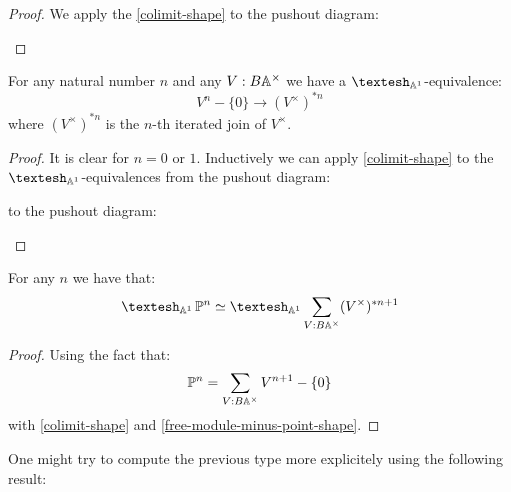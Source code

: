 \begin{proof}
We apply the \cref{colimit-shape} to the pushout diagram:
 \begin{center}
  \end{center}
  \end{proof}

\begin{lemma}\label{free-module-minus-point-shape}
For any natural number $n$ and any $V:B\mathbb{A}^\times$ we have a $\shape_{\A^1}$-equivalence:
\[V^{n}-\{0\} \to (V^\times)^{*n}\]
where $(V^\times)^{*n}$ is the $n$-th iterated join of $V^\times$.
\end{lemma}

\begin{proof}
It is clear for $n=0$ or $1$. Inductively we can apply \cref{colimit-shape} to the $\shape_{\A^1}$-equivalences from the pushout diagram:
 \begin{center}
  \end{center}
  to the pushout diagram:
   \begin{center}
  \end{center}
\end{proof}

\begin{proposition}
For any $n$ we have that:
\[\shape_{\A^1} \bP^n \simeq \shape_{\A^1} \sum_{V:B\A^\times} (V^\times)^{*n+1}\]
\end{proposition}

\begin{proof}
Using the fact that:
\[\mathbb{P}^n = \sum_{V:B\mathbb{A}^\times} V^{n+1}-\{0\}\]
with \cref{colimit-shape} and \cref{free-module-minus-point-shape}.
\end{proof}

One might try to compute the previous type more explicitely using the following result:


